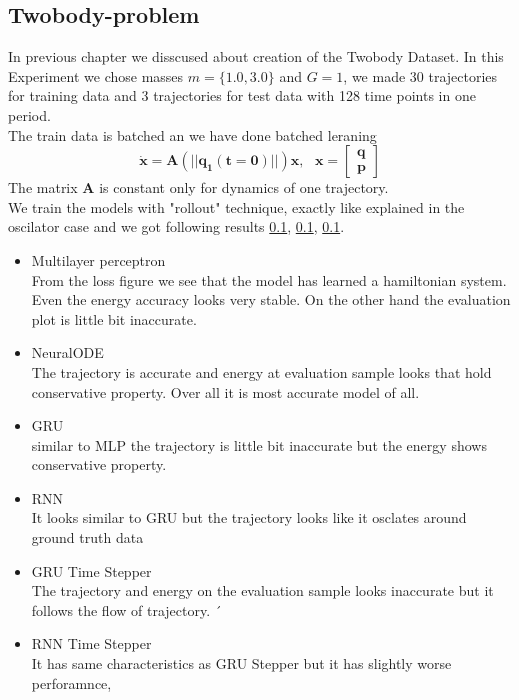\subsection{Twobody-problem}
In previous chapter we disscused about creation of the Twobody Dataset.
In this Experiment we chose masses $m=\{1.0,3.0\}$ and $G=1$, we made 30 trajectories for training data and 3 trajectories for test data with 128 time points in one period.\\
The train data is batched an we have done batched leraning\begin{equation}
	\dot{\mathbf{x}} = \mathbf{A}(||\mathbf{q_1(t=0)}||)\mathbf{x},\text{  }\mathbf{x} = \begin{bmatrix}
		\mathbf{q}\\
		\mathbf{p}
	\end{bmatrix}
\end{equation} The matrix $\mathbf{A}$ is constant only for dynamics of one trajectory.\\
We train the models with "rollout" technique, exactly like explained in the oscilator case and we got following results \ref{}, \ref{}, \ref{}.
\begin{itemize}
	\item Multilayer perceptron\\
	From the loss figure we see that the model has learned a hamiltonian system. Even the energy accuracy looks very stable. On the other hand the evaluation plot is little bit inaccurate.
	
	
	\item NeuralODE\\
	The trajectory is accurate and energy at evaluation sample looks that hold conservative property. Over all it is most accurate model of all.
	
	
	\item GRU\\
	similar to MLP the trajectory is little bit inaccurate but the energy shows conservative property.
	
	\item RNN\\
	It looks similar to GRU but the trajectory looks like it osclates around ground truth data 

	\item GRU Time Stepper\\
	The trajectory and energy on the evaluation sample looks inaccurate but it follows the flow of trajectory. ´

	\item RNN Time Stepper\\
	It has same characteristics as GRU Stepper but it has slightly worse perforamnce,
	
\end{itemize}

